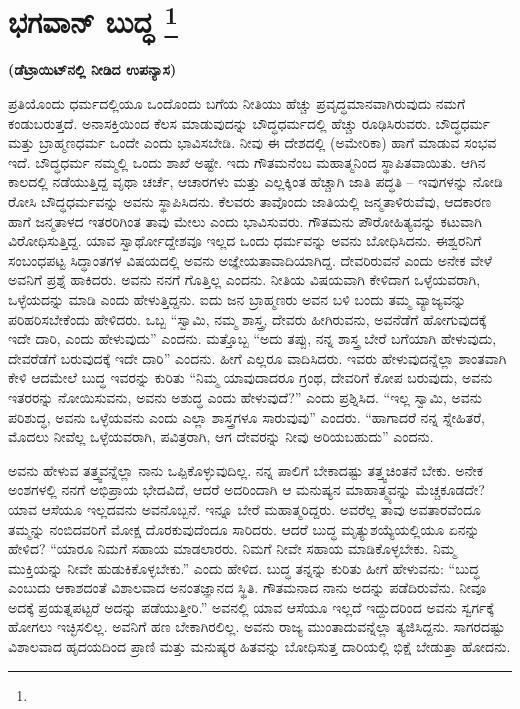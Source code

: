 
\chapter[ಭಗವಾನ್ ಬುದ್ಧ ]{ಭಗವಾನ್ ಬುದ್ಧ \protect\footnote{}}

\centerline{\textbf{(ಡೆಟ್ರಾಯಿಟ್​ನಲ್ಲಿ ನೀಡಿದ ಉಪನ್ಯಾಸ)}}

ಪ್ರತಿಯೊಂದು ಧರ್ಮದಲ್ಲಿಯೂ ಒಂದೊಂದು ಬಗೆಯ ನೀತಿಯು ಹೆಚ್ಚು ಪ್ರವೃದ್ಧಮಾನವಾಗಿರುವುದು ನಮಗೆ ಕಂಡುಬರುತ್ತದೆ. ಅನಾಸಕ್ತಿಯಿಂದ ಕೆಲಸ ಮಾಡುವುದನ್ನು ಬೌದ್ಧಧರ್ಮದಲ್ಲಿ ಹೆಚ್ಚು ರೂಢಿಸಿರುವರು. ಬೌದ್ಧಧರ್ಮ ಮತ್ತು ಬ್ರಾಹ್ಮಣಧರ್ಮ ಒಂದೇ ಎಂದು ಭಾವಿಸಬೇಡಿ. ನೀವು ಈ ದೇಶದಲ್ಲಿ (ಅಮೇರಿಕಾ) ಹಾಗೆ ಮಾಡುವ ಸಂಭವ ಇದೆ. ಬೌದ್ಧಧರ್ಮ ನಮ್ಮಲ್ಲಿ ಒಂದು ಶಾಖೆ ಅಷ್ಟೇ. ಇದು ಗೌತಮನೆಂಬ ಮಹಾತ್ಮನಿಂದ ಸ್ಥಾಪಿತವಾಯಿತು. ಆಗಿನ ಕಾಲದಲ್ಲಿ ನಡೆಯುತ್ತಿದ್ದ ವೃಥಾ ಚರ್ಚೆ, ಆಚಾರಗಳು ಮತ್ತು ಎಲ್ಲಕ್ಕಿಂತ ಹೆಚ್ಚಾಗಿ ಜಾತಿ ಪದ್ಧತಿ – ಇವುಗಳನ್ನು ನೋಡಿ ರೋಸಿ ಬೌದ್ಧಧರ್ಮವನ್ನು ಅವನು ಸ್ಥಾಪಿಸಿದನು. ಕೆಲವರು ತಾವೊಂದು ಜಾತಿಯಲ್ಲಿ ಜನ್ಮತಾಳಿರುವೆವು, ಆದಕಾರಣ ಹಾಗೆ ಜನ್ಮತಾಳದ ಇತರರಿಗಿಂತ ತಾವು ಮೇಲು ಎಂದು ಭಾವಿಸುವರು. ಗೌತಮನು ಪೌರೋಹಿತ್ಯವನ್ನು ಕಟುವಾಗಿ ವಿರೋಧಿಸುತ್ತಿದ್ದ. ಯಾವ ಸ್ವಾರ್ಥೋದ್ದೇಶವೂ ಇಲ್ಲದ ಒಂದು ಧರ್ಮವನ್ನು ಅವನು ಬೋಧಿಸಿದನು. ಈಶ್ವರನಿಗೆ ಸಂಬಂಧಪಟ್ಟ ಸಿದ್ಧಾಂತಗಳ ವಿಷಯದಲ್ಲಿ ಅವನು ಅಜ್ಞೇಯತಾವಾದಿಯಾಗಿದ್ದ. ದೇವರಿರುವನೆ ಎಂದು ಅನೇಕ ವೇಳೆ ಅವನಿಗೆ ಪ್ರಶ್ನೆ ಹಾಕಿದರು. ಅವನು ನನಗೆ ಗೊತ್ತಿಲ್ಲ ಎಂದನು. ನೀತಿಯ ವಿಷಯವಾಗಿ ಕೇಳಿದಾಗ ಒಳ್ಳೆಯವರಾಗಿ, ಒಳ್ಳೆಯದನ್ನು ಮಾಡಿ ಎಂದು ಹೇಳುತ್ತಿದ್ದನು. ಐದು ಜನ ಬ್ರಾಹ್ಮಣರು ಅವನ ಬಳಿ ಬಂದು ತಮ್ಮ ವ್ಯಾಜ್ಯವನ್ನು ಪರಿಹರಿಸಬೇಕೆಂದು ಹೇಳಿದರು. ಒಬ್ಬ “ಸ್ವಾಮಿ, ನಮ್ಮ ಶಾಸ್ತ್ರ, ದೇವರು ಹೀಗಿರುವನು, ಅವನೆಡೆಗೆ ಹೋಗುವುದಕ್ಕೆ ಇದೇ ದಾರಿ, ಎಂದು ಹೇಳುವುದು” ಎಂದನು. ಮತ್ತೊಬ್ಬ “ಅದು ತಪ್ಪು, ನನ್ನ ಶಾಸ್ತ್ರ ಬೇರೆ ಬಗೆಯಾಗಿ ಹೇಳುವುದು, ದೇವರೆಡೆಗೆ ಬರುವುದಕ್ಕೆ ಇದೇ ದಾರಿ” ಎಂದನು. ಹೀಗೆ ಎಲ್ಲರೂ ವಾದಿಸಿದರು. ಇವರು ಹೇಳುವುದನ್ನೆಲ್ಲಾ ಶಾಂತವಾಗಿ ಕೇಳಿ ಆದಮೇಲೆ ಬುದ್ಧ ಇವರನ್ನು ಕುರಿತು “ನಿಮ್ಮ ಯಾವುದಾದರೂ ಗ್ರಂಥ, ದೇವರಿಗೆ ಕೋಪ ಬರುವುದು, ಅವನು ಇತರರನ್ನು ನೋಯಿಸುವನು, ಅವನು ಅಶುದ್ಧ ಎಂದು ಹೇಳುವುದೆ?” ಎಂದು ಪ್ರಶ್ನಿಸಿದ. “ಇಲ್ಲ ಸ್ವಾಮಿ, ಅವನು ಪರಿಶುದ್ಧ, ಅವನು ಒಳ್ಳೆಯವನು ಎಂದು ಎಲ್ಲಾ ಶಾಸ್ತ್ರಗಳೂ ಸಾರುವುವು” ಎಂದರು. “ಹಾಗಾದರೆ ನನ್ನ ಸ್ನೇಹಿತರೆ, ಮೊದಲು ನೀವೆಲ್ಲ ಒಳ್ಳೆಯವರಾಗಿ, ಪವಿತ್ರರಾಗಿ, ಆಗ ದೇವರನ್ನು ನೀವು ಅರಿಯಬಹುದು” ಎಂದನು.

\eject

ಅವನು ಹೇಳುವ ತತ್ತ್ವವನ್ನೆಲ್ಲಾ ನಾನು ಒಪ್ಪಿಕೊಳ್ಳುವುದಿಲ್ಲ. ನನ್ನ ಪಾಲಿಗೆ ಬೇಕಾದಷ್ಟು ತತ್ತ್ವಚಿಂತನೆ ಬೇಕು. ಅನೇಕ ಅಂಶಗಳಲ್ಲಿ ನನಗೆ ಅಭಿಪ್ರಾಯ ಭೇದವಿದೆ, ಆದರೆ ಅದರಿಂದಾಗಿ ಆ ಮನುಷ್ಯನ ಮಾಹಾತ್ಮ್ಯವನ್ನು ಮೆಚ್ಚಕೂಡದೇ? ಯಾವ ಆಸೆಯೂ ಇಲ್ಲದವನು ಅವನೊಬ್ಬನೆ. ಇನ್ನೂ ಬೇರೆ ಮಹಾತ್ಮರಿದ್ದರು. ಅವರೆಲ್ಲ ತಾವು ಅವತಾರವೆಂದೂ ತಮ್ಮನ್ನು ನಂಬಿದವರಿಗೆ ಮೋಕ್ಷ ದೊರಕುವುದೆಂದೂ ಸಾರಿದರು. ಆದರೆ ಬುದ್ಧ ಮೃತ್ಯುಶಯ್ಯೆಯಲ್ಲಿಯೂ ಏನನ್ನು ಹೇಳಿದ? “ಯಾರೂ ನಿಮಗೆ ಸಹಾಯ ಮಾಡ\-ಲಾರರು. ನಿಮಗೆ ನೀವೇ ಸಹಾಯ ಮಾಡಿಕೊಳ್ಳಬೇಕು. ನಿಮ್ಮ ಮುಕ್ತಿಯನ್ನು ನೀವೇ ಹುಡುಕಿಕೊಳ್ಳಬೇಕು.” ಎಂದು ಹೇಳಿದ. ಬುದ್ಧ ತನ್ನನ್ನು ಕುರಿತು ಹೀಗೆ ಹೇಳುವನು: “ಬುದ್ಧ ಎಂಬುದು ಆಕಾಶದಂತೆ ವಿಶಾಲವಾದ ಅನಂತಜ್ಞಾನದ ಸ್ಥಿತಿ. ಗೌತಮನಾದ ನಾನು ಅದನ್ನು ಪಡೆದಿರು\-ವೆನು. ನೀವೂ ಅದಕ್ಕೆ ಪ್ರಯತ್ನಪಟ್ಟರೆ ಅದನ್ನು ಪಡೆಯುತ್ತೀರಿ.” ಅವನಲ್ಲಿ ಯಾವ ಆಸೆಯೂ ಇಲ್ಲದೆ ಇದ್ದುದರಿಂದ ಅವನು ಸ್ವರ್ಗಕ್ಕೆ ಹೋಗಲು ಇಚ್ಛಿಸಲಿಲ್ಲ. ಅವನಿಗೆ ಹಣ ಬೇಕಾಗಿರಲಿಲ್ಲ. ಅವನು ರಾಜ್ಯ ಮುಂತಾದುವನ್ನೆಲ್ಲಾ ತ್ಯಜಿಸಿದ್ದನು. ಸಾಗರದಷ್ಟು ವಿಶಾಲವಾದ ಹೃದಯದಿಂದ ಪ್ರಾಣಿ ಮತ್ತು ಮನುಷ್ಯರ ಹಿತವನ್ನು ಬೋಧಿಸುತ್ತ ದಾರಿಯಲ್ಲಿ ಭಿಕ್ಷೆ ಬೇಡುತ್ತಾ ಹೋದನು.

